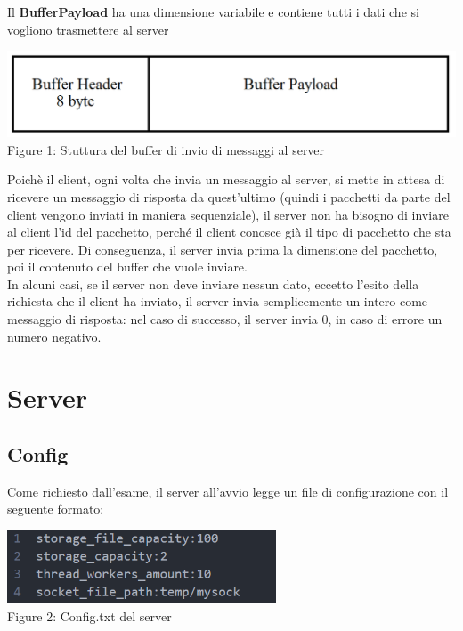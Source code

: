 \documentclass{article}
\begin{document}
Il \textbf{BufferPayload} ha una dimensione variabile e contiene tutti i dati che si vogliono trasmettere al server

\begin{center}
    \includegraphics[width=\textwidth]{buffer}   
    Figure 1: Stuttura del buffer di invio di messaggi al server
\end{center}

Poichè il client, ogni volta che invia un messaggio al server, si mette in attesa di ricevere un messaggio di risposta da quest'ultimo (quindi i pacchetti da parte del 
client vengono inviati in maniera sequenziale), il server non ha bisogno di inviare al client l'id del pacchetto, perché il client conosce già il tipo di pacchetto 
che sta per ricevere. Di conseguenza, il server invia prima la dimensione del pacchetto, poi il contenuto del buffer che vuole inviare. \\ In alcuni casi, se il server
non deve inviare nessun dato, eccetto l'esito della richiesta che il client ha inviato, il server invia semplicemente un intero come messaggio di risposta:
nel caso di successo, il server invia 0, in caso di errore un numero negativo. 

\section{Server}

\subsection{Config}
Come richiesto dall'esame, il server all'avvio legge un file di configurazione con il seguente formato:

\begin{center}
    \includegraphics[width=80mm]{config} 
    \\Figure 2: Config.txt del server
\end{center}
\end{document}
